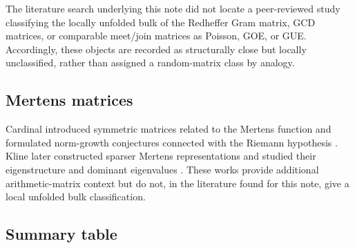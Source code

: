 \documentclass[11pt]{amsart}
\numberwithin{equation}{section}
\theoremstyle{plain}
\theoremstyle{definition}
\theoremstyle{remark}
\begin{document}
The literature search underlying this note did not locate a peer-reviewed study classifying the locally unfolded bulk of the Redheffer Gram matrix, GCD matrices, or comparable meet/join matrices as Poisson, GOE, or GUE.  Accordingly, these objects are recorded as structurally close but locally unclassified, rather than assigned a random-matrix class by analogy.

\subsection{Mertens matrices}
\label{subsec:mertens_matrices}

Cardinal introduced symmetric matrices related to the Mertens function and formulated norm-growth conjectures connected with the Riemann hypothesis \cite{Cardinal2010}.  Kline later constructed sparser Mertens representations and studied their eigenstructure and dominant eigenvalues \cite{Kline2019,Kline2020}.  These works provide additional arithmetic-matrix context but do not, in the literature found for this note, give a local unfolded bulk classification.

\subsection{Summary table}
\label{subsec:literature_table}
\end{document}
